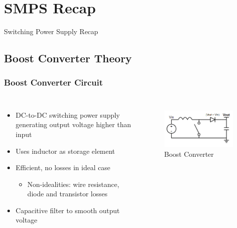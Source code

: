 \documentclass{beamer}
\begin{document}
\begin{frame}
\titlepage

\setcounter{tocdepth}{1}
\tableofcontents
\end{frame}


\section{SMPS Recap} %
\begin{frame}
\centering \huge Switching Power Supply Recap
\end{frame}

\subsection{Boost Converter Theory}

\begin{frame}
\frametitle{Boost Converter Circuit}
\begin{columns}[t]
\begin{itemize}
  \item DC-to-DC switching power supply generating output voltage higher than input
  \item Uses inductor as storage element
  \item Efficient, no losses in ideal case
  \begin{itemize}
    \item Non-idealities: wire resistance, diode and transistor losses
  \end{itemize}
  \item Capacitive filter to smooth output voltage
\end{itemize}

\begin{figure}
  \centering
  \includegraphics[scale=0.33]{images-dis4/smps-boost} \\
  Boost Converter
\end{figure}
\end{columns}
\end{frame}
\end{document}
